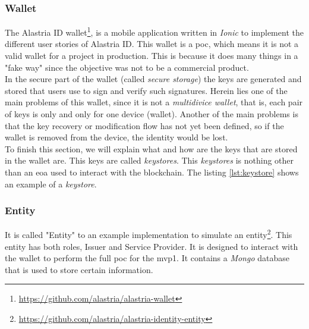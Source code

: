 \documentclass[a4paper, 12pt]{article} %
\begin{document}
        \subsubsection{Wallet}
            The Alastria ID wallet\footnote{\url{https://github.com/alastria/alastria-wallet}}, is a mobile application written in \textit{Ionic} to implement the different user stories of Alastria ID. This wallet is a \acrfull{poc}, which means it is not a valid wallet for a project in production. This is because it does many things in a "fake way" since the objective was not to be a commercial product.\\
            
            In the secure part of the wallet (called \textit{secure storage}) the keys are generated and stored that users use to sign and verify such signatures. Herein lies one of the main problems of this wallet, since it is not a \textit{multidivice wallet}, that is, each pair of keys is only and only for one device (wallet). Another of the main problems is that the key recovery or modification flow has not yet been defined, so if the wallet is removed from the device, the identity would be lost.\\
            
            To finish this section, we will explain what and how are the keys that are stored in the wallet are. This keys are called \textit{keystores}. This \textit{keystores} is nothing other than an \acrfull{eoa} used to interact with the blockchain. The listing \ref{lst:keystore} shows an example of a \textit{keystore}.
            
        
        \subsubsection{Entity}
            It is called "Entity" to an example implementation to simulate an entity\footnote{\url{https://github.com/alastria/alastria-identity-entity}}. This entity has both roles, Issuer and Service Provider. It is designed to interact with the wallet to perform the full \acrshort{poc} for the \acrshort{mvp}1. It contains a \textit{Mongo} database that is used to store certain information.\\
            
\end{document}
